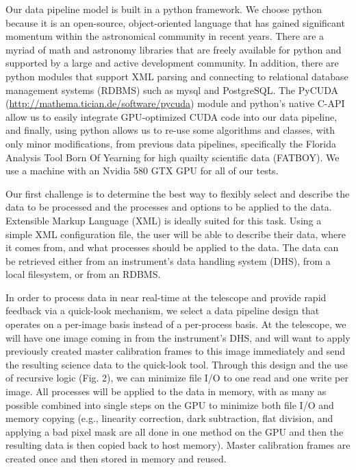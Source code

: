 Our data pipeline model is built in a python framework.  We choose python
because it is an open-source, object-oriented language that has gained
significant momentum within the astronomical community in recent years.
There are a myriad of math and astronomy libraries that are freely available
for python and supported by a large and active development community.  In
addition, there are python modules that support XML parsing and connecting
to relational database management systems (RDBMS) such as mysql and
PostgreSQL.  The PyCUDA
(\url{http://mathema.tician.de/software/pycuda}) module and python's native
C-API allow us to easily integrate GPU-optimized CUDA code into our data
pipeline, and finally, using python allows us to re-use some algorithms
and classes, with only minor modifications, from previous data pipelines,
specifically the Florida Analysis Tool Born Of Yearning for high quailty
scientific data (FATBOY).  We use a machine with an Nvidia 580 GTX GPU for
all of our tests.

Our first challenge is to determine the best way to flexibly select and
describe the data to be processed and the processes and options to be
applied to the data.  Extensible Markup Language (XML) is ideally suited for
this task.  Using a simple XML configuration file, the user will be able to
describe their data, where it comes from, and what processes should be applied
to the data.  The data can be retrieved either from an instrument's data
handling system (DHS), from a local filesystem, or from an RDBMS.
 
In order to process data in near real-time at the telescope and provide
rapid feedback via a quick-look mechanism, we select a data pipeline design
that operates on a per-image basis instead of a per-process basis.  At the
telescope, we will have one image coming in from the instrument's DHS, 
and will want to apply previously created master calibration frames to this
image immediately and send the resulting science data to the quick-look tool.
Through this design and the use of recursive logic (Fig. 2), we can minimize
file I/O to one read and one write per image.  All processes will be
applied to the data in memory, with as many as possible combined into
single steps on the GPU to minimize both file I/O and memory copying
(e.g., linearity correction, dark subtraction, flat division, and applying
a bad pixel mask are all done in one method on the GPU and then the resulting
data is then copied back to host memory).  Master calibration frames are
created once and then stored in memory and reused.


